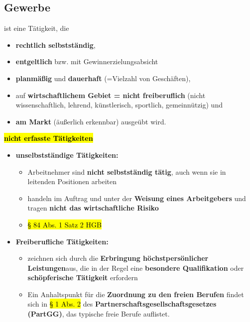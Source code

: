 \documentclass[a4paper, 10pt]{article}
\begin{document}
\subsection{Gewerbe}
ist eine Tätigkeit, die
\begin{itemize}
    \item \textbf{rechtlich selbstständig},
    \item \textbf{entgeltlich} bzw. mit Gewinnerzielungsabsicht
    \item \textbf{planmäßig} und \textbf{dauerhaft} (=Vielzahl von Geschäften),
    \item auf \textbf{wirtschaftlichem Gebiet = nicht freiberuflich} (nicht wissenschaftlich, lehrend, künstlerisch, sportlich, gemeinnützig) und
    \item \textbf{am Markt} (äußerlich erkennbar) ausgeübt wird.
\end{itemize}
\hl{\textbf{nicht erfasste Tätigkeiten}}
\begin{itemize}
    \item \textbf{unselbstständige Tätigkeiten:}
    \begin{itemize}
        \item Arbeitnehmer sind \textbf{nicht selbstständig tätig}, auch wenn sie in leitenden Positionen arbeiten
        \item handeln im Auftrag und unter der \textbf{Weisung eines Arbeitgebers} und tragen \textbf{nicht das wirtschaftliche Risiko} 
        \item \hl{§ 84 Abs. 1 Satz 2 HGB}
    \end{itemize}

    \item \textbf{Freiberufliche Tätigkeiten:}
    \begin{itemize}
        \item zeichnen sich durch die \textbf{Erbringung höchstpersönlicher Leistungen}aus, die in der Regel eine \textbf{besondere Qualifikation} oder \textbf{schöpferische Tätigkeit} erfordern

        \item Ein Anhaltspunkt für die \textbf{Zuordnung zu den freien Berufen} findet sich in \hl{§ 1 Abs. 2 }des \textbf{Partnerschaftsgesellschaftsgesetzes (PartGG)}, das typische freie Berufe auflistet.
    \end{itemize}
\end{itemize}
\end{document}
